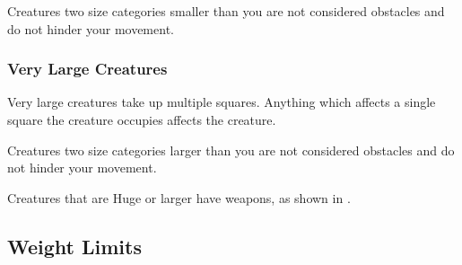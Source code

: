              Creatures two size categories smaller than you are not considered obstacles and do not hinder your movement.

        \subsubsection{Very Large Creatures}\label{Very Large Creatures}
             Very large creatures take up multiple squares. Anything which affects a single square the creature occupies affects the creature.

             Creatures two size categories larger than you are not considered obstacles and do not hinder your movement.

             Creatures that are Huge or larger have  weapons, as shown in .

    \subsection{Weight Limits}\label{Weight Limits}


